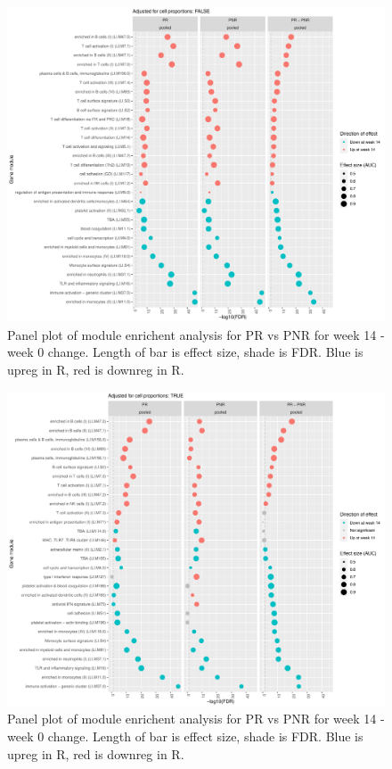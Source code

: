 \begin{outline}
\begin{figure}
    \centering
    \includegraphics[width=1.0\textwidth,page=1]{mainmatter/figures/chapter_04/plot_gene_set_enrichment.tmodCERNO_panelplot_reversed_C_3R_1R,C_3N_1N,C_(3R_1R)_(3N_1N).cell_prop_correction_FALSE.pdf}
    \caption{Panel plot of module enrichent analysis for PR vs PNR for week 14 - week 0 change. Length of bar is effect size, shade is FDR. Blue is upreg in R, red is downreg in R.}
    \label{fig:multipants_dge_panelPlot_week_14_0_R_N_cellPropF}
\end{figure}

\begin{figure}
    \centering
    \includegraphics[width=1.0\textwidth,page=1]{mainmatter/figures/chapter_04/plot_gene_set_enrichment.tmodCERNO_panelplot_reversed_C_3R_1R,C_3N_1N,C_(3R_1R)_(3N_1N).cell_prop_correction_TRUE.pdf}
    \caption{Panel plot of module enrichent analysis for PR vs PNR for week 14 - week 0 change. Length of bar is effect size, shade is FDR. Blue is upreg in R, red is downreg in R.}
    \label{fig:multipants_dge_panelPlot_week_14_0_R_N_cellPropT}
\end{figure}


\end{outline}
